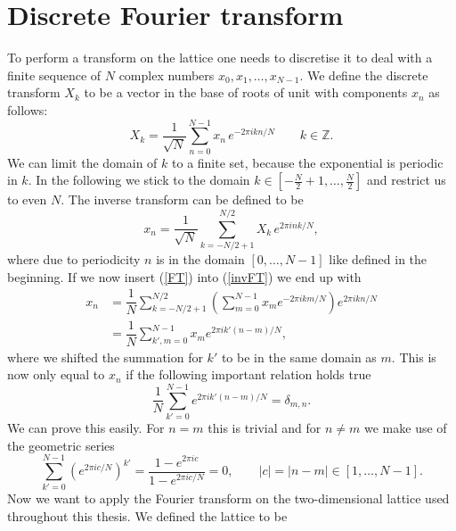 \chapter{Discrete Fourier transform}
\label{app: disc_ft}
To perform a  transform on the lattice one needs to discretise it to deal with a finite sequence of $N$ complex numbers $x_{0},x_{1},\ldots,x_{N-1}$. We define the discrete  transform $X_{k}$ to be a vector in the base of roots of unit with components $x_{n}$ as follows:
\begin{equation}
X_{k}=\dfrac{1}{\sqrt{N}} \sum\limits_{n=0}^{N-1} x_{n} \, e ^{-2\pi  i kn /N} \qquad  k \in \mathbb{Z}.
\label{FT}
\end{equation}
We can limit the domain of $k$ to a finite set, because the exponential is periodic in $k$. In the following we stick to the domain $k \in \left[ -\tfrac{N}{2}+1,\ldots,\tfrac{N}{2} \right]$ and restrict us to even $N$. The inverse transform can be defined to be
%
\begin{equation}
 x_{n}= \dfrac{1}{\sqrt{N}} \sum\limits_{k=-N/2+1}^{N/2} X_{k} \, e ^{2 \pi  i nk /N},
 \label{invFT}
 \end{equation}
 where due to periodicity $n$ is in the domain $\left[0,\ldots,N-1\right]$ like defined in the beginning. If we now insert (\ref{FT}) into (\ref{invFT}) we end up with
\begin{align}
x_{n} &=\dfrac{1}{N}\sum\limits_{k=-N/2+1}^{N/2} \left( \sum\limits_{m=0}^{N-1} x_{m}  e ^{-2\pi  i km /N} \right)  e ^{2\pi  i kn /N} \\
%
%
&= \dfrac{1}{N} \sum\limits_{k',m=0}^{N-1} x_{m}  e ^{2\pi  i k'(n-m) /N},
\end{align}
where we shifted the summation for $k'$ to be in the same domain as $m$. This is now only equal to $x_{n}$ if the following important relation holds true
%
%
\begin{equation}
\dfrac{1}{N} \sum\limits_{k'=0}^{N-1}  e ^{2\pi  i k'(n-m) /N} = \delta_{m,n}.
\end{equation}
We can prove this easily. For $n=m$ this is trivial and for $n\neq m$ we make use of the geometric series
\begin{equation}
\sum\limits_{k'=0}^{N-1} \left( e ^{2\pi i  c/N }\right)^{k'} = \dfrac{1- e ^{2\pi i  c}}{1- e ^{2\pi i  c/N }} = 0, \qquad  \vert c\vert = \vert n-m \vert \in [1,\ldots,N-1].
\end{equation}
%
%
Now we want to apply the Fourier transform on the two-dimensional lattice used throughout this thesis. We defined the lattice to be
